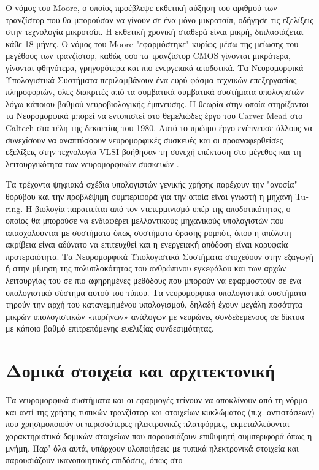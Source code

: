 \documentclass[12pt]{report}
\begin{document}
Ο νόμος του \textlatin{Moore}, ο οποίος προέβλεψε εκθετική αύξηση του αριθμού των τρανζίστορ που θα μπορούσαν να γίνουν σε ένα μόνο μικροτσίπ, οδήγησε τις εξελίξεις στην τεχνολογία μικροτσίπ. Η εκθετική χρονική σταθερά είναι μικρή, διπλασιάζεται κάθε 18 μήνες. Ο νόμος του \textlatin{Moore} "εφαρμόστηκε" κυρίως μέσω της μείωσης του μεγέθους των τρανζίστορ, καθώς οσο τα τρανζίστορ CMOS γίνονται μικρότερα, γίνονται φθηνότερα, γρηγορότερα και πιο ενεργειακά αποδοτικά.
Τα Νευρομορφικά Υπολογιστικά Συστήματα περιλαμβάνουν ένα ευρύ φάσμα τεχνικών επεξεργασίας πληροφοριών, όλες διακριτές από τα συμβατικά συμβατικά συστήματα υπολογιστών λόγω κάποιου βαθμού νευροβιολογικής έμπνευσης. Η θεωρία στην οποία στηρίζονται τα Νευρομορφικά μπορεί να εντοπιστεί στο θεμελιώδες έργο του \textlatin{Carver Mead} στο \textlatin{Caltech} στα τέλη της δεκαετίας του 1980. Αυτό το πρώιμο έργο ενέπνευσε άλλους να συνεχίσουν να αναπτύσσουν νευρομορφικές συσκευές και οι προαναφερθείσες εξελίξεις στην τεχνολογία \textlatin{VLSI} βοήθησαν τη συνεχή επέκταση στο μέγεθος και τη λειτουργικότητα των νευρομορφικών συσκευών \cite{furber2016}.

Τα τρέχοντα ψηφιακά σχέδια υπολογιστών γενικής χρήσης παρέχουν την "ανοσία" θορύβου και την προβλέψιμη συμπεριφορά για την οποία είναι γνωστή η μηχανή \textlatin{Turing}. Η βιολογία παραιτείται από τον ντετερμινισμό υπέρ της αποδοτικότητας, ο οποίος θα μπορούσε να ενδιαφέρει μελλοντικούς μηχανικούς υπολογιστών που απασχολούνται με συστήματα όπως συστήματα όρασης ρομπότ, όπου η απόλυτη ακρίβεια είναι αδύνατο να επιτευχθεί και η ενεργειακή απόδοση είναι κορυφαία προτεραιότητα. Τα Νευρομορφικά Υπολογιστικά Συστήματα στοχεύουν στην εξαγωγή ή στην μίμηση της πολυπλοκότητας του ανθρώπινου εγκεφάλου και των αρχών λειτουργίας του σε πιο αφηρημένες μεθόδους που μπορούν να εφαρμοστούν σε ένα υπολογιστικό σύστημα αυτού του τύπου. Τα νευρομορφικά υπολογιστικά συστήματα τηρούν την αρχή του κατανεμημένου υπολογισμού, δηλαδή έχουν μεγάλη ποσότητα μικρών υπολογιστικών «πυρήνων» ανάλογων με νευρώνες συνδεδεμένους σε δίκτυα με κάποιο βαθμό επιτρεπόμενης ευελιξίας συνδεσιμότητας. 

\section{Δομικά στοιχεία και αρχιτεκτονική}

Τα νευρομορφικά συστήματα και οι εφαρμογές τείνουν να αποκλίνουν από τη νόρμα και αντί της χρήσης τυπικών τρανζίστορ και στοιχείων κυκλώματος (π.χ. αντιστάσεων) που χρησιμοποιούν οι περισσότερες ηλεκτρονικές πλατφόρμες, εκμεταλλεύονται χαρακτηριστικά δομικών στοιχείων που παρουσιάζουν επιθυμητή συμπεριφορά όπως η μνήμη. Παρ' όλα αυτά, υπάρχουν υλοποιήσεις με τυπικά ηλεκτρονικά στοιχεία και παρουσιάζουν ικανοποιητικές επιδόσεις, όπως στο \cite{Clayton2011}
\end{document}
